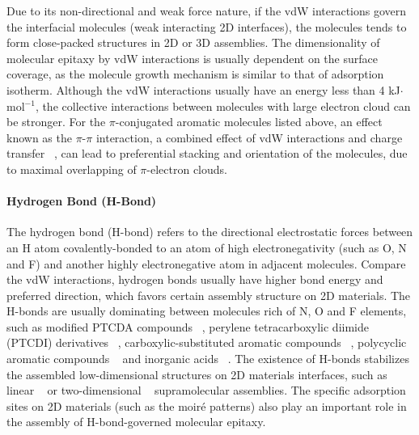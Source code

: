 Due to its non-directional and weak force nature, if the vdW
interactions govern the interfacial molecules (weak interacting 2D
interfaces), the molecules tends to form close-packed structures in 2D
or 3D assemblies. The dimensionality of molecular epitaxy by vdW
interactions is usually dependent on the surface coverage, as the
molecule growth mechanism is similar to that of adsorption
isotherm. Although the vdW interactions usually have an energy less than
4 kJ\(\cdot\)mol\(^{-1}\), the collective interactions between molecules
with large electron cloud can be stronger. For the \(\pi\)-conjugated
aromatic molecules listed above, an effect known as the \(\pi\)-\(\pi\)
interaction, a combined effect of vdW interactions and charge
transfer ~\cite{Hunter_1990_pi}, can lead to preferential stacking and
orientation of the molecules, due to maximal overlapping of
\(\pi\)-electron clouds. 


\paragraph{Hydrogen Bond (H-Bond)}

The hydrogen bond (H-bond) refers to the directional electrostatic
forces between an H atom covalently-bonded to an atom of high
electro\-negativity (such as O, N and F) and another highly
electro\-negative atom in adjacent molecules. Compare the vdW
interactions, hydrogen bonds usually have higher bond energy and
preferred direction, which favors certain assembly structure on 2D
materials. The H-bonds are usually dominating between molecules rich
of N, O and F elements, such as modified PTCDA compounds
~\cite{Mura_2010_DFT_H_bond_PTCDA_gr,Karmel_2014_assembl_hetero_gr},
perylene tetra\-carboxylic diimide (PTCDI) derivatives
~\cite{Pollard_2010_hbond_assembly_gr,Karmel_2014_PTCDI_gr},
carboxylic-substituted aromatic compounds
~\cite{Rochefort_2009_aro_graphene_mech,Addou_2013_TPA_gr}, polycyclic
aromatic compounds
~\cite{Kozlov_2012_polyaro_gr,Roos_2011_BTP_gr,Meier_2010_polycyclic_gr}
and inorganic acids ~\cite{Prado_2011_2D_acid_gr}. The existence of
H-bonds stabilizes the assembled low-dimensional structures on 2D
materials interfaces, such as linear
~\cite{Pollard_2010_hbond_assembly_gr} or two-dimensional
~\cite{Prado_2011_2D_acid_gr} supra\-molecular assemblies. The specific
adsorption sites on 2D materials (such as the moiré patterns) also
play an important role in the assembly of H-bond-governed molecular
epitaxy.


